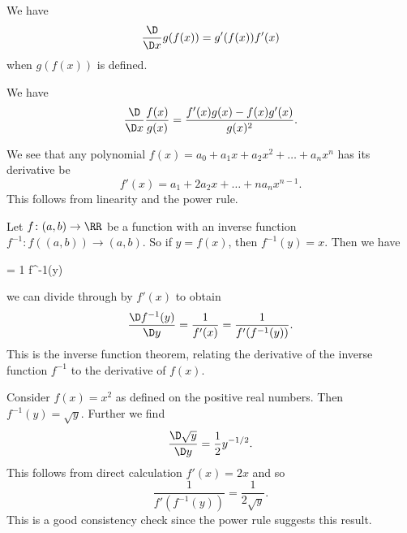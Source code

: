 \begin{definition}
\begin{node}\label{calculus-000U}%
We have
\[\frac{\D}{\D x}g(f(x))=g'(f(x))f'(x)\]
when $g(f(x))$ is defined.
\end{node}

\begin{corollary}\label{calculus-000V}%
We have
\[\frac{\D}{\D x}\frac{f(x)}{g(x)}=\frac{f'(x)g(x)-f(x)g'(x)}{g(x)^{2}}.\]
\end{corollary}

\begin{example}\label{calculus-000C}%
We see that any polynomial
$f(x)=a_{0}+a_{1}x+a_{2}x^{2}+\dots+a_{n}x^{n}$ has its derivative be
\begin{equation*}
f'(x) = a_{1} + 2a_{2}x+\dots+na_{n}x^{n-1}.
\end{equation*}
This follows from linearity and the power rule.
\end{example}

\begin{node}\label{calculus-001A}%
Let $f\colon(a,b)\to\RR$ be a function with an inverse function
$f^{-1}\colon f((a,b))\to(a,b)$. So if $y=f(x)$, then $f^{-1}(y)=x$.
Then we have
\begin{calculation}
   = 1
  f^{-1}(y)
\end{calculation}
we can divide through by $f'(x)$ to obtain
\[\frac{\D f^{-1}(y)}{\D y}=\frac{1}{f'(x)}=\frac{1}{f'(f^{-1}(y))}.\]
This is the inverse function theorem, relating the derivative of the
inverse function $f^{-1}$ to the derivative of $f(x)$.

\begin{example}\label{calculus-001B}%
Consider $f(x)=x^{2}$ as defined on the positive real numbers. Then
$f^{-1}(y)=\sqrt{y}$. Further we find
\[\frac{\D\sqrt{y}}{\D y}=\frac{1}{2}y^{-1/2}.\]
This follows from direct calculation $f'(x)=2x$ and so
\[\frac{1}{f'(f^{-1}(y))}=\frac{1}{2\sqrt{y}}.\]
This is a good consistency check since the power rule suggests
this result.
\end{example}
\end{node}
\end{definition}

